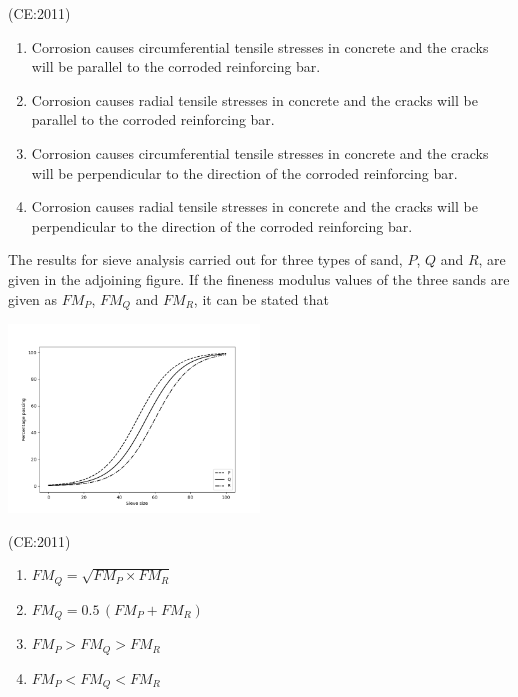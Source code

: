 	\hfill (CE:2011)
        \begin{enumerate}
            \item Corrosion causes circumferential tensile stresses in concrete and the cracks will be parallel to the corroded reinforcing bar.
            \item Corrosion causes radial tensile stresses in concrete and the cracks will be parallel to the corroded reinforcing bar.
            \item Corrosion causes circumferential tensile stresses in concrete and the cracks will be perpendicular to the direction of the corroded reinforcing bar.
            \item Corrosion causes radial tensile stresses in concrete and the cracks will be perpendicular to the direction of the corroded reinforcing bar.
        \end{enumerate}

    \item 
	    The results for sieve analysis carried out for three types of sand, $P$, $Q$ and $R$, are given in the adjoining figure. If the fineness modulus values of the three sands are given as $FM_P$, $FM_Q$ and $FM_R$, it can be stated that

	    \begin{center}
    \includegraphics[width=0.5\textwidth]{figs/ce2011graph.png}
\end{center}
	    \hfill (CE:2011)
    \begin{multicols}{2}
        \begin{enumerate}
            \item \(FM_Q = \sqrt{FM_P \times FM_R}\)
            \item \(FM_Q = 0.5 \, (FM_P + FM_R)\)
            \item \(FM_P > FM_Q > FM_R\)
            \item \(FM_P < FM_Q < FM_R\)
        \end{enumerate}
    \end{multicols}
    
